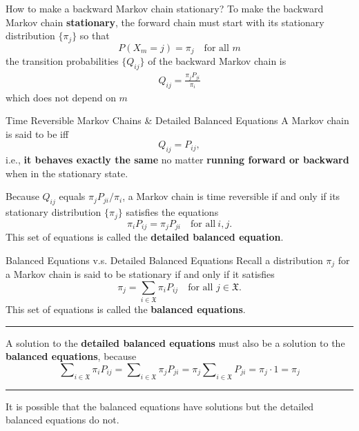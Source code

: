 \documentclass[letterpaper, mathserif]{beamer}
\def\Sum{\sum\nolimits}
\def\X{\mathfrak{X}}
\begin{document}
\begin{frame}{How to make a backward Markov chain stationary?}
To make the backward Markov chain {\bf stationary}, the forward chain must start with its stationary distribution
$\{\pi_j\}$ so that
$$
P(X_m=j) = \pi_j \quad\text{for all }m
$$
the transition probabilities $\{Q_{ij}\}$ of the backward Markov chain is
\begin{align*}
Q_{ij} =\frac{\pi_j P_{ji}}{\pi_i}
\end{align*}
which does not depend on $m$
\end{frame}
\begin{frame}{Time Reversible Markov Chains \& Detailed Balanced Equations}
A Markov chain is said to be  iff $$Q_{ij}=P_{ij},$$
i.e., {\bf it behaves exactly the same} no matter {\bf running forward or backward} when in the stationary state.\par\medskip

Because $Q_{ij}$ equals $\pi_j P_{ji}/\pi_i$, a Markov chain is time reversible if and only if
its stationary distribution $\{\pi_j\}$ satisfies the equations
$$\pi_i P_{ij}=\pi_j P_{ji}\quad\mbox{for all}\ i,j.$$
This set of equations is called the {\bf detailed balanced equation}.
\end{frame}
\begin{frame}{Balanced Equations v.s. Detailed Balanced Equations}
Recall a distribution ${\pi_j}$ for a Markov chain is said to be stationary if and only if
it satisfies
$$\pi_j = \sum_{i\in\X}\pi_i P_{ij}\quad\text{for all }j\in\X.$$
This set of equations is called the {\bf balanced equations}.\pause

\medskip\hrule\medskip
A solution to the {\bf detailed balanced equations}
must also be a solution to the {\bf balanced equations}, because
$$
\Sum_{i\in\mathfrak{X}}\pi_i P_{ij}=\Sum_{i\in\mathfrak{X}}\pi_j P_{ji}
=\pi_j\Sum_{i\in\mathfrak{X}}P_{ji}=\pi_j\cdot 1=\pi_j
$$\pause
\medskip\hrule\medskip
It is possible that the balanced equations have solutions but
the detailed balanced equations do not.
\end{frame}
\end{document}
